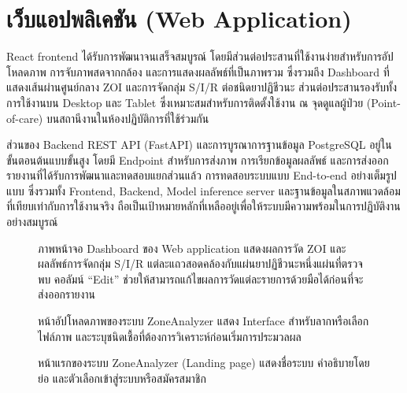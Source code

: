 \section{เว็บแอปพลิเคชัน (Web Application)}
\label{sec:webapp}

React frontend ได้รับการพัฒนาจนเสร็จสมบูรณ์ โดยมีส่วนต่อประสานที่ใช้งานง่ายสำหรับการอัปโหลดภาพ การจับภาพสดจากกล้อง และการแสดงผลลัพธ์ที่เป็นภาพรวม ซึ่งรวมถึง Dashboard ที่แสดงเส้นผ่านศูนย์กลาง ZOI และการจัดกลุ่ม S/I/R ต่อชนิดยาปฏิชีวนะ ส่วนต่อประสานรองรับทั้งการใช้งานบน Desktop และ Tablet ซึ่งเหมาะสมสำหรับการติดตั้งใช้งาน ณ จุดดูแลผู้ป่วย (Point-of-care) บนสถานีงานในห้องปฏิบัติการที่ใช้ร่วมกัน

ส่วนของ Backend REST API (FastAPI) และการบูรณาการฐานข้อมูล PostgreSQL อยู่ในขั้นตอนต้นแบบขั้นสูง โดยมี Endpoint สำหรับการส่งภาพ การเรียกข้อมูลผลลัพธ์ และการส่งออกรายงานที่ได้รับการพัฒนาและทดสอบแยกส่วนแล้ว การทดสอบระบบแบบ End-to-end อย่างเต็มรูปแบบ ซึ่งรวมทั้ง Frontend, Backend, Model inference server และฐานข้อมูลในสภาพแวดล้อมที่เทียบเท่ากับการใช้งานจริง ถือเป็นเป้าหมายหลักที่เหลืออยู่เพื่อให้ระบบมีความพร้อมในการปฏิบัติงานอย่างสมบูรณ์

\begin{figure}[H]
  \centering
  \caption{ภาพหน้าจอ Dashboard ของ Web application แสดงผลการวัด ZOI และผลลัพธ์การจัดกลุ่ม S/I/R
           แต่ละแถวสอดคล้องกับแผ่นยาปฏิชีวนะหนึ่งแผ่นที่ตรวจพบ
           คอลัมน์ ``Edit'' ช่วยให้สามารถแก้ไขผลการวัดแต่ละรายการด้วยมือได้ก่อนที่จะส่งออกรายงาน}
  \label{fig:webapp}
\end{figure}

\begin{figure}[H]
  \centering
  \caption{หน้าอัปโหลดภาพของระบบ ZoneAnalyzer แสดง Interface สำหรับลากหรือเลือกไฟล์ภาพ
    และระบุชนิดเชื้อที่ต้องการวิเคราะห์ก่อนเริ่มการประมวลผล}
  \label{fig:webapp_upload}
\end{figure}

\begin{figure}[H]
  \centering
  \caption{หน้าแรกของระบบ ZoneAnalyzer (Landing page) แสดงชื่อระบบ คำอธิบายโดยย่อ
    และตัวเลือกเข้าสู่ระบบหรือสมัครสมาชิก}
  \label{fig:webapp_home}
\end{figure}
